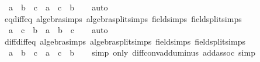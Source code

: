 \begin{isabellebody}
\ \ {\isachardoublequoteopen}a\ {\isacharminus}{\kern0pt}\ b\ {\isacharequal}{\kern0pt}\ c\ {\isasymlongleftrightarrow}\ a\ {\isacharequal}{\kern0pt}\ c\ {\isacharplus}{\kern0pt}\ b{\isachardoublequoteclose}\isanewline
%
\isadelimproof
\ \ %
\endisadelimproof
%
\isatagproof
{}\isamarkupfalse%
\ auto%
\endisatagproof
{\isafoldproof}%
%
\isadelimproof
\isanewline
%
\endisadelimproof
\isanewline
{}\isamarkupfalse%
\ eq{\isacharunderscore}{\kern0pt}diff{\isacharunderscore}{\kern0pt}eq\ {\isacharbrackleft}{\kern0pt}algebra{\isacharunderscore}{\kern0pt}simps{\isacharcomma}{\kern0pt}\ algebra{\isacharunderscore}{\kern0pt}split{\isacharunderscore}{\kern0pt}simps{\isacharcomma}{\kern0pt}\ field{\isacharunderscore}{\kern0pt}simps{\isacharcomma}{\kern0pt}\ field{\isacharunderscore}{\kern0pt}split{\isacharunderscore}{\kern0pt}simps{\isacharbrackright}{\kern0pt}{\isacharcolon}{\kern0pt}\isanewline
\ \ {\isachardoublequoteopen}a\ {\isacharequal}{\kern0pt}\ c\ {\isacharminus}{\kern0pt}\ b\ {\isasymlongleftrightarrow}\ a\ {\isacharplus}{\kern0pt}\ b\ {\isacharequal}{\kern0pt}\ c{\isachardoublequoteclose}\isanewline
%
\isadelimproof
\ \ %
\endisadelimproof
%
\isatagproof
{}\isamarkupfalse%
\ auto%
\endisatagproof
{\isafoldproof}%
%
\isadelimproof
\isanewline
%
\endisadelimproof
\isanewline
{}\isamarkupfalse%
\ diff{\isacharunderscore}{\kern0pt}diff{\isacharunderscore}{\kern0pt}eq{}\ {\isacharbrackleft}{\kern0pt}algebra{\isacharunderscore}{\kern0pt}simps{\isacharcomma}{\kern0pt}\ algebra{\isacharunderscore}{\kern0pt}split{\isacharunderscore}{\kern0pt}simps{\isacharcomma}{\kern0pt}\ field{\isacharunderscore}{\kern0pt}simps{\isacharcomma}{\kern0pt}\ field{\isacharunderscore}{\kern0pt}split{\isacharunderscore}{\kern0pt}simps{\isacharbrackright}{\kern0pt}{\isacharcolon}{\kern0pt}\isanewline
\ \ {\isachardoublequoteopen}a\ {\isacharminus}{\kern0pt}\ {\isacharparenleft}{\kern0pt}b\ {\isacharminus}{\kern0pt}\ c{\isacharparenright}{\kern0pt}\ {\isacharequal}{\kern0pt}\ {\isacharparenleft}{\kern0pt}a\ {\isacharplus}{\kern0pt}\ c{\isacharparenright}{\kern0pt}\ {\isacharminus}{\kern0pt}\ b{\isachardoublequoteclose}\isanewline
%
\isadelimproof
\ \ %
\endisadelimproof
%
\isatagproof
{}\isamarkupfalse%
\ {\isacharparenleft}{\kern0pt}simp\ only{\isacharcolon}{\kern0pt}\ diff{\isacharunderscore}{\kern0pt}conv{\isacharunderscore}{\kern0pt}add{\isacharunderscore}{\kern0pt}uminus\ add{\isachardot}{\kern0pt}assoc{\isacharparenright}{\kern0pt}\ simp%
\endisatagproof
{\isafoldproof}%
%
\isadelimproof
\isanewline

\end{isabellebody}
